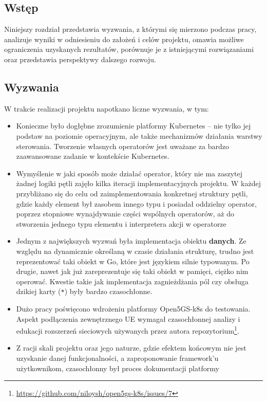 \subsection{Wstęp}
Niniejszy rozdział przedstawia wyzwania, z którymi się mierzono podczas pracy, analizuje wyniki w odniesieniu do założeń i celów projektu, omawia możliwe ograniczenia uzyskanych rezultatów, porównuje je z istniejącymi rozwiązaniami oraz przedstawia perspektywy dalszego rozwoju.

\subsection{Wyzwania}

W trakcie realizacji projektu napotkano liczne wyzwania, w tym:
\begin{itemize}
    \item Konieczne było dogłębne zrozumienie platformy Kubernetes – nie tylko jej podstaw na poziomie operacyjnym, ale także mechanizmów działania warstwy sterowania. Tworzenie własnych operatorów jest uważane za bardzo zaawansowane zadanie w kontekście Kubernetes.
    \item Wymyślenie w jaki sposób może działać operator, który nie ma zaszytej żadnej logiki pętli zajęło kilka iteracji implementacyjnych projektu. W każdej przybliżano się do celu od zaimplementowania konkretnej struktury pętli, gdzie każdy element był zasobem innego typu i posiadał oddzielny operator, poprzez stopniowe wynajdywanie części wspólnych operatorów, aż do stworzenia jednego typu elementu i interpretera akcji w operatorze
    \item Jednym z największych wyzwań była implementacja obiektu \textbf{danych}. Ze względu na dynamicznie określaną w czasie działania strukturę, trudno jest reprezentować taki obiekt w Go, które jest językiem silnie typowanym. Po drugie, nawet jak już zareprezentuje się taki obiekt w pamięci, ciężko nim operować. Kwestie takie jak implementacja zagnieżdżania pól czy obsługa dzikiej karty (\texttt{*}) były bardzo czasochłonne.
    \item Dużo pracy poświęcono wdrożeniu platformy Open5GS-k8s do testowania. Aspekt podłączenia zewnętrznego UE wymagał czasochłonnej analizy i edukacji rozszerzeń sieciowych używanych przez autora repozytorium\footnote{\url{https://github.com/niloysh/open5gs-k8s/issues/7}}.
    \item Z racji skali projektu oraz jego naturze, gdzie efektem końcowym nie jest uzyskanie danej funkcjonalności, a zaproponowanie framework'u użytkownikom, czasochłonny był proces dokumentacji platformy
\end{itemize}


